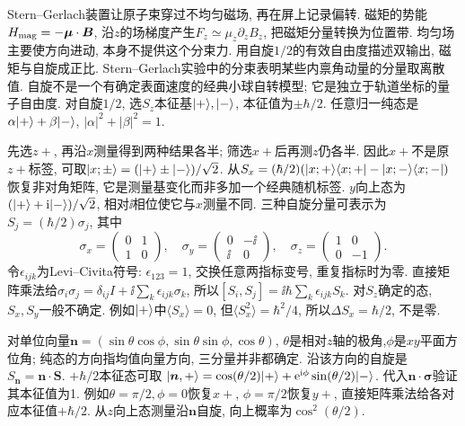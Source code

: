 Stern--Gerlach装置让原子束穿过不均匀磁场, 再在屏上记录偏转. 磁矩的势能$H_{\rm mag}=-\boldsymbol\mu\cdot\boldsymbol B$, 沿$z$的场梯度产生$F_z\simeq\mu_z\partial_zB_z$, 把磁矩分量转换为位置带. 均匀场主要使方向进动, 本身不提供这个分束力. 用自旋$1/2$的有效自由度描述双输出, 磁矩与自旋成正比. Stern--Gerlach实验中的分束表明某些内禀角动量的分量取离散值. 自旋不是一个有确定表面速度的经典小球自转模型; 它是独立于轨道坐标的量子自由度. 对自旋$1/2$, 选$S_z$本征基$\lvert +\rangle,\lvert -\rangle$, 本征值为$\pm\hbar/2$. 任意归一纯态是$\alpha\lvert +\rangle+\beta\lvert -\rangle$, $|\alpha|^2+|\beta|^2=1$.

先选$z+$, 再沿$x$测量得到两种结果各半; 筛选$x+$后再测$z$仍各半. 因此$x+$不是原$z+$标签, 可取$\lvert x;\pm\rangle=(\lvert +\rangle\pm\lvert -\rangle)/\sqrt2$. 从$S_x=(\hbar/2)(\lvert x;+\rangle\langle x;+\rvert-\lvert x;-\rangle\langle x;-\rvert)$恢复非对角矩阵, 它是测量基变化而非多加一个经典随机标签. $y$向上态为$(\lvert +\rangle+\mathrm i\lvert -\rangle)/\sqrt2$, 相对$\ii$相位使它与$x$测量不同. 三种自旋分量可表示为$S_j=(\hbar/2)\sigma_j$, 其中
\[
\sigma_x=\begin{pmatrix}0&1\\1&0\end{pmatrix},\quad
\sigma_y=\begin{pmatrix}0&-\ii\\\ii&0\end{pmatrix},\quad
\sigma_z=\begin{pmatrix}1&0\\0&-1\end{pmatrix}.
\]
令$\epsilon_{ijk}$为Levi--Civita符号: $\epsilon_{123}=1$, 交换任意两指标变号, 重复指标时为零. 直接矩阵乘法给$\sigma_i\sigma_j=\delta_{ij}I+\ii\sum_k\epsilon_{ijk}\sigma_k$, 所以$[S_i,S_j]=\ii\hbar\sum_k\epsilon_{ijk}S_k$. 对$S_z$确定的态, $S_x,S_y$一般不确定. 例如$\lvert +\rangle$中$\langle S_x\rangle=0$, 但$\langle S_x^2\rangle=\hbar^2/4$, 所以$\Delta S_x=\hbar/2$, 不是零.

对单位向量$\boldsymbol n=(\sin\theta\cos\phi,\sin\theta\sin\phi,\cos\theta)$, $\theta$是相对$z$轴的极角,$\phi$是$xy$平面方位角; 纯态的方向指均值向量方向, 三分量并非都确定. 沿该方向的自旋是$S_{\boldsymbol n}=\boldsymbol n\cdot\boldsymbol S$. $+\hbar/2$本征态可取
$\lvert \boldsymbol n,+\rangle=\cos(\theta/2)\lvert +\rangle +\mathrm e^{\mathrm i\phi}\sin(\theta/2)\lvert -\rangle$. 代入$\boldsymbol n\cdot\boldsymbol\sigma$验证其本征值为1. 例如$\theta=\pi/2,\phi=0$恢复$x+$, $\phi=\pi/2$恢复$y+$, 直接矩阵乘法给各对应本征值$+\hbar/2$. 从$z$向上态测量沿$\boldsymbol n$自旋, 向上概率为$\cos^2(\theta/2)$.

